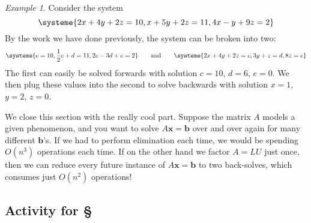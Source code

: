 \documentclass[11pt,oneside]{amsbook}
\theoremstyle{definition}
\theoremstyle{plain}
\theoremstyle{definition}
\theoremstyle{remark}
\newtheorem{example}[theorem]{Example}
\numberwithin{equation}{section}
\numberwithin{figure}{section}
\begin{document}
\begin{example}
  Consider the system
  \[\systeme{2x+4y+2z=10,x+5y+2z=11,4x-y+9z=2}
  \]
  By the work we have done previously, the system can be broken into two:
  \[\systeme{c=10,\frac12c+d=11,2c-3d+e=2}
    \qquad\text{and}\qquad
    \systeme{2x+4y+2z=c,3y+z=d,8z=e}
  \]
  The first can easily be solved forwards with solution $c=10$, $d=6$, $e=0$. We then plug these values into the second to solve backwards with solution $x=1$, $y=2$, $z=0$.
\end{example}

We close this section with the really cool part. Suppose the matrix $A$ models a given phenomenon, and you want to solve $A\mathbf{x}=\mathbf{b}$ over and over again for many different $\mathbf{b}$'s. If we had to perform elimination each time, we would be spending $O(n^3)$ operations each time. If on the other hand we factor $A=LU$ just once, then we can reduce every future instance of $A\mathbf{x}=\mathbf{b}$ to two back-solves, which consumes just $O(n^2)$ operations!

\newpage
\subsection*{Activity for \S \thesection}
\end{document}
